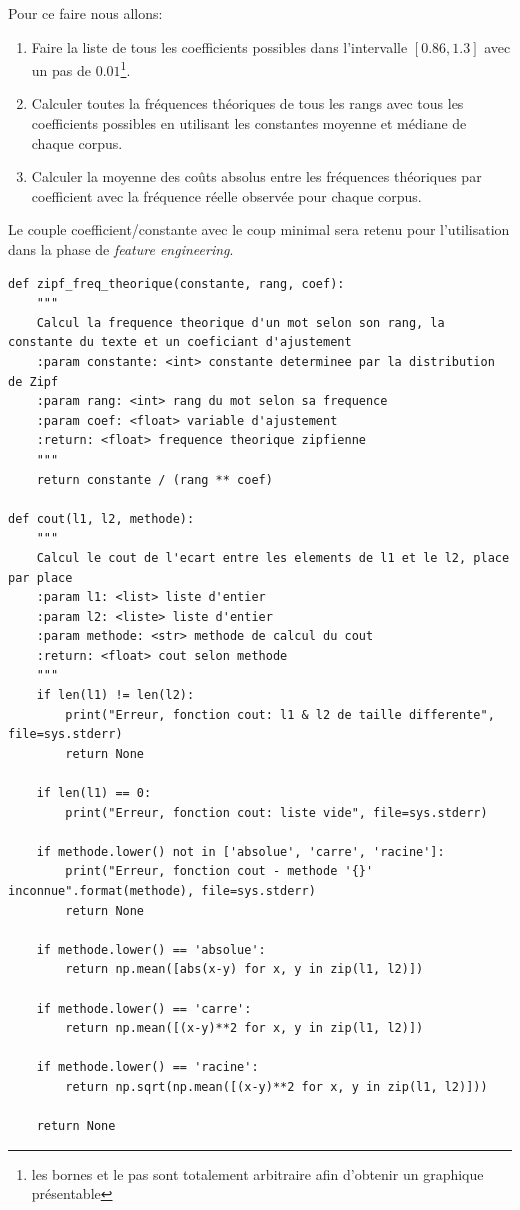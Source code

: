 \documentclass[a4paper,12pt]{article}
\begin{document}
			Pour ce faire nous allons:

			\begin{enumerate}
				\item Faire la liste de tous les coefficients possibles dans l'intervalle $[0.86, 1.3]$ avec un pas de $0.01$\footnote{les bornes et le pas sont totalement arbitraire afin d'obtenir un graphique présentable}.
				\item Calculer toutes la fréquences théoriques de tous les rangs avec tous les coefficients possibles en utilisant les constantes moyenne et médiane de chaque corpus.
				\item Calculer la moyenne des coûts absolus entre les fréquences théoriques par coefficient avec la fréquence réelle observée pour chaque corpus.\\
			\end{enumerate}
			
			Le couple coefficient/constante avec le coup minimal sera retenu pour l'utilisation dans la phase de \emph{feature engineering}. \\	
			
			\begin{lstlisting}[title=Fonctions utilisées dans la recherche du coefficient]
def zipf_freq_theorique(constante, rang, coef):
    """
    Calcul la frequence theorique d'un mot selon son rang, la constante du texte et un coeficiant d'ajustement
    :param constante: <int> constante determinee par la distribution de Zipf
    :param rang: <int> rang du mot selon sa frequence
    :param coef: <float> variable d'ajustement
    :return: <float> frequence theorique zipfienne
    """
    return constante / (rang ** coef)
    
def cout(l1, l2, methode):
    """
    Calcul le cout de l'ecart entre les elements de l1 et le l2, place par place
    :param l1: <list> liste d'entier
    :param l2: <liste> liste d'entier
    :param methode: <str> methode de calcul du cout
    :return: <float> cout selon methode
    """
    if len(l1) != len(l2):
        print("Erreur, fonction cout: l1 & l2 de taille differente", file=sys.stderr)
        return None

    if len(l1) == 0:
        print("Erreur, fonction cout: liste vide", file=sys.stderr)

    if methode.lower() not in ['absolue', 'carre', 'racine']:
        print("Erreur, fonction cout - methode '{}' inconnue".format(methode), file=sys.stderr)
        return None

    if methode.lower() == 'absolue':
        return np.mean([abs(x-y) for x, y in zip(l1, l2)])

    if methode.lower() == 'carre':
        return np.mean([(x-y)**2 for x, y in zip(l1, l2)])

    if methode.lower() == 'racine':
        return np.sqrt(np.mean([(x-y)**2 for x, y in zip(l1, l2)]))

    return None\end{lstlisting}
\end{document}
